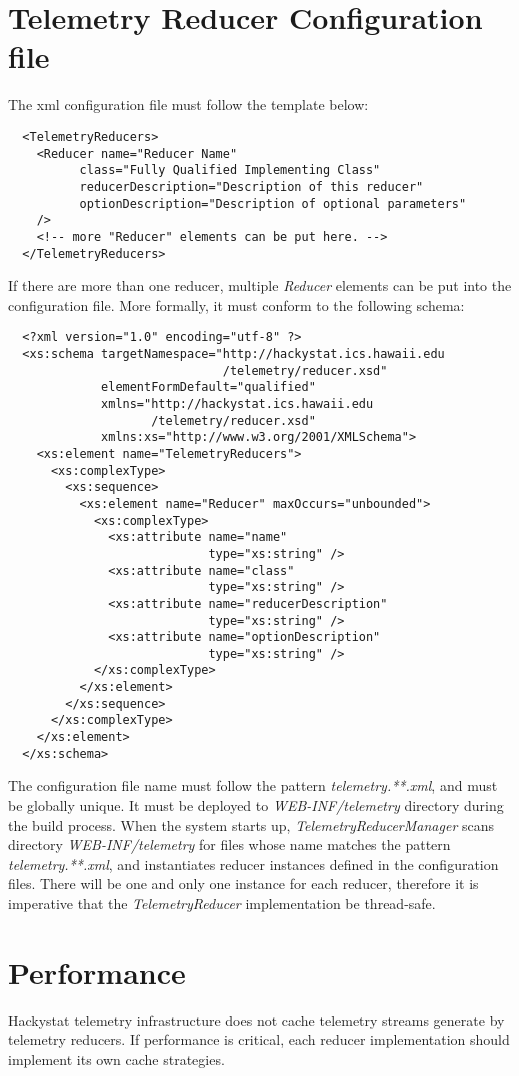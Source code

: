 \section{Telemetry Reducer Configuration file}

The xml configuration file must follow the template below:

\begin{verbatim}
  <TelemetryReducers>
    <Reducer name="Reducer Name" 
          class="Fully Qualified Implementing Class"
          reducerDescription="Description of this reducer"
          optionDescription="Description of optional parameters" 
    />
    <!-- more "Reducer" elements can be put here. -->
  </TelemetryReducers>
\end{verbatim}


If there are more than one reducer, multiple \textit{Reducer} elements can be put into the configuration file. More formally, it must conform to the following schema:

\begin{verbatim}
  <?xml version="1.0" encoding="utf-8" ?>
  <xs:schema targetNamespace="http://hackystat.ics.hawaii.edu
                              /telemetry/reducer.xsd"
             elementFormDefault="qualified"
             xmlns="http://hackystat.ics.hawaii.edu
                    /telemetry/reducer.xsd"
             xmlns:xs="http://www.w3.org/2001/XMLSchema">
    <xs:element name="TelemetryReducers">
      <xs:complexType>
        <xs:sequence>
          <xs:element name="Reducer" maxOccurs="unbounded">
            <xs:complexType>
              <xs:attribute name="name" 
                            type="xs:string" />
              <xs:attribute name="class" 
                            type="xs:string" />
              <xs:attribute name="reducerDescription" 
                            type="xs:string" />
              <xs:attribute name="optionDescription" 
                            type="xs:string" />
            </xs:complexType>
          </xs:element>
        </xs:sequence>
      </xs:complexType>
    </xs:element>
  </xs:schema>
\end{verbatim}

The configuration file name must follow the pattern \textit{telemetry.**.xml}, and must be globally unique. It must be deployed to \textit{WEB-INF/telemetry} directory during the build process. When the system starts up, \textit{TelemetryReducerManager} scans directory \textit{WEB-INF/telemetry} for files whose name matches the pattern \textit{telemetry.**.xml}, and instantiates reducer instances defined in the configuration files. There will be one and only one instance for each reducer, therefore it is imperative that the \textit{TelemetryReducer} implementation be thread-safe.



 



\section{Performance}

Hackystat telemetry infrastructure does not cache telemetry streams generate by telemetry reducers. If performance is critical, each reducer implementation should implement its own cache strategies.